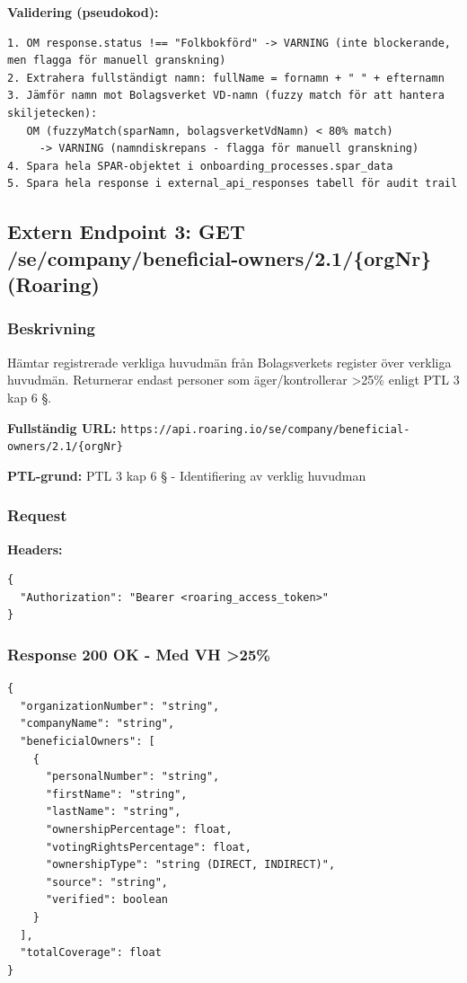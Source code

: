 \documentclass[12pt,a4paper]{article}
\begin{document}
\textbf{Validering (pseudokod):}
\begin{lstlisting}
1. OM response.status !== "Folkbokförd" -> VARNING (inte blockerande, men flagga för manuell granskning)
2. Extrahera fullständigt namn: fullName = fornamn + " " + efternamn
3. Jämför namn mot Bolagsverket VD-namn (fuzzy match för att hantera skiljetecken):
   OM (fuzzyMatch(sparNamn, bolagsverketVdNamn) < 80% match)
     -> VARNING (namndiskrepans - flagga för manuell granskning)
4. Spara hela SPAR-objektet i onboarding_processes.spar_data
5. Spara hela response i external_api_responses tabell för audit trail
\end{lstlisting}

\subsection{Extern Endpoint 3: GET /se/company/beneficial-owners/2.1/\{orgNr\} (Roaring)}

\subsubsection{Beskrivning}

Hämtar registrerade verkliga huvudmän från Bolagsverkets register över verkliga huvudmän. Returnerar endast personer som äger/kontrollerar >25\% enligt PTL 3 kap 6 §.

\textbf{Fullständig URL:} \texttt{https://api.roaring.io/se/company/beneficial-owners/2.1/\{orgNr\}}

\textbf{PTL-grund:} PTL 3 kap 6 § - Identifiering av verklig huvudman

\subsubsection{Request}

\textbf{Headers:}
\begin{lstlisting}
{
  "Authorization": "Bearer <roaring_access_token>"
}
\end{lstlisting}

\subsubsection{Response 200 OK - Med VH >25\%}

\begin{lstlisting}
{
  "organizationNumber": "string",
  "companyName": "string",
  "beneficialOwners": [
    {
      "personalNumber": "string",
      "firstName": "string",
      "lastName": "string",
      "ownershipPercentage": float,
      "votingRightsPercentage": float,
      "ownershipType": "string (DIRECT, INDIRECT)",
      "source": "string",
      "verified": boolean
    }
  ],
  "totalCoverage": float
}
\end{lstlisting}
\end{document}
